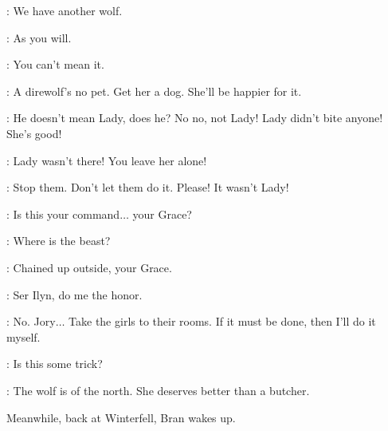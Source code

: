 \CERSEI: We have another wolf. 

\ROBERT: As you will. 

\NED: You can't mean it. 

\ROBERT: A direwolf's no pet. Get her a dog. She'll be happier for it. 

\SANSA: He doesn't mean Lady, does he? No no, not Lady! Lady didn't bite anyone! She's good! 

\ARYA: Lady wasn't there! You leave her alone! 

\SANSA: Stop them. Don't let them do it. Please! It wasn't Lady! 

\NED: Is this your command$\ldots$ your Grace? 

\CERSEI: Where is the beast? 

\SOLDIERa: Chained up outside, your Grace. 

\CERSEI: Ser Ilyn, do me the honor. 

\NED: No. Jory$\ldots$ Take the girls to their rooms. If it must be done, then I'll do it myself. 

\CERSEI: Is this some trick? 

\NED: The wolf is of the north. She deserves better than a butcher.

\scene

\n Meanwhile, back at Winterfell, Bran wakes up.


